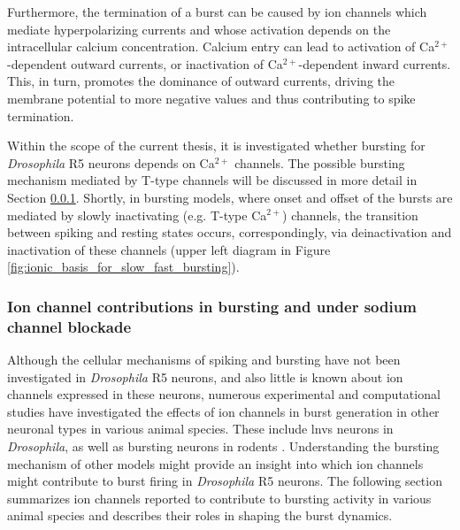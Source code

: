 \documentclass[../main.tex]{subfiles}
\begin{document}
Furthermore, the termination of a burst can be caused by ion channels which mediate hyperpolarizing currents and whose activation depends on the intracellular calcium concentration. Calcium entry can lead to activation of Ca$^{2+}$-dependent outward currents, or inactivation of Ca$^{2+}$-dependent inward currents. This, in turn, promotes the dominance of outward currents, driving the membrane potential to more negative values and thus contributing to spike termination.

Within the scope of the current thesis, it is investigated whether bursting for \textit{Drosophila} R5 neurons depends on Ca$^{2+}$ channels. The possible bursting mechanism mediated by T-type channels will be discussed in more detail in Section \ref{subsubsec:ion_channel_contributions}. Shortly, in bursting models, where onset and offset of the bursts are mediated by slowly inactivating (e.g. T-type Ca$^{2+}$) channels, the transition between spiking and resting states occurs, correspondingly, via deinactivation and inactivation of these channels (upper left diagram in Figure \ref{fig:ionic_basis_for_slow_fast_bursting}).


\subsubsection{Ion channel contributions in bursting and under sodium channel blockade} \label{subsubsec:ion_channel_contributions}

Although the cellular mechanisms of spiking and bursting have not been investigated in \textit{Drosophila} R5 neurons, and also little is known about ion channels expressed in these neurons, numerous experimental and computational studies have investigated the effects of ion channels in burst generation in other neuronal types in various animal species. These include \glspl{lnv} neurons in \textit{Drosophila}, as well as bursting neurons in rodents \parencite{vickstromTTypeCalciumChannels2020,golombContributionPersistentNa2006,liuMultipleConductancesCooperatively2008,wangMultipleDynamicalModes1994,mccormickModelElectrophysiologicalProperties1992}. Understanding the bursting mechanism of other models might provide an insight into which ion channels might contribute to burst firing in \textit{Drosophila} R5 neurons. The following section summarizes ion channels reported to contribute to bursting activity in various animal species and describes their roles in shaping the burst dynamics.
\end{document}
